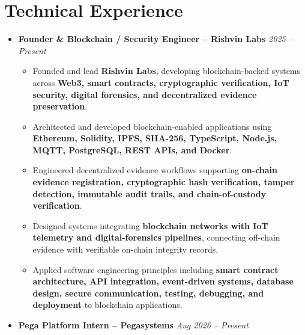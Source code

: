 \documentclass[a4paper,11pt]{article}
\newcommand{\resumeItem}[1]{
    \item \small{#1 \vspace{-2pt}}
}
\begin{document}
\vspace{-10pt}


\section{Technical Experience}

\begin{itemize}[leftmargin=0in, label={}]

\item
\textbf{Founder \& Blockchain / Security Engineer -- Rishvin Labs}
\hfill \textit{2025 -- Present}

\begin{itemize}[leftmargin=*]

\resumeItem{Founded and lead \textbf{Rishvin Labs}, developing blockchain-backed systems across \textbf{Web3, smart contracts, cryptographic verification, IoT security, digital forensics, and decentralized evidence preservation}.}

\resumeItem{Architected and developed blockchain-enabled applications using \textbf{Ethereum, Solidity, IPFS, SHA-256, TypeScript, Node.js, MQTT, PostgreSQL, REST APIs, and Docker}.}

\resumeItem{Engineered decentralized evidence workflows supporting \textbf{on-chain evidence registration, cryptographic hash verification, tamper detection, immutable audit trails, and chain-of-custody verification}.}

\resumeItem{Designed systems integrating \textbf{blockchain networks with IoT telemetry and digital-forensics pipelines}, connecting off-chain evidence with verifiable on-chain integrity records.}

\resumeItem{Applied software engineering principles including \textbf{smart contract architecture, API integration, event-driven systems, database design, secure communication, testing, debugging, and deployment} to blockchain applications.}

\end{itemize}

\vspace{30pt}


\item
\textbf{Pega Platform Intern -- Pegasystems}
\hfill \textit{Aug 2026 -- Present}

\begin{itemize}[leftmargin=*]


\end{itemize}
\end{itemize}
\end{document}
